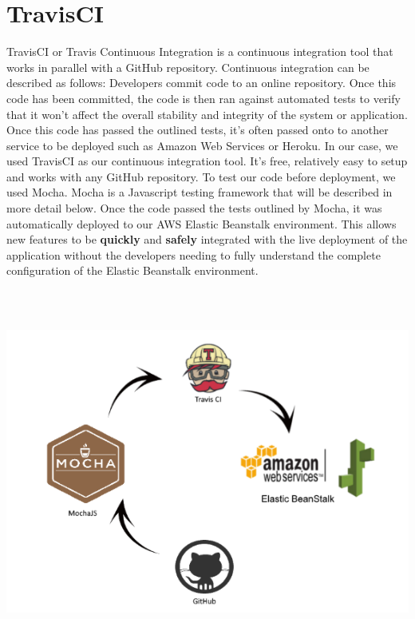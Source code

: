 \section{TravisCI}
TravisCI or Travis Continuous Integration is a continuous integration tool that works in parallel with a GitHub repository. Continuous integration can be described as follows: Developers commit code to an online repository. Once this code has been committed, the code is then ran against automated tests to verify that it won't affect the overall stability and integrity of the system or application. Once this
code has passed the outlined tests, it's often passed onto to another service to be deployed such as Amazon Web Services or Heroku. In our case, we used TravisCI as our continuous integration tool. It's free, relatively easy to setup and works with any GitHub repository. To test our code before deployment, we used Mocha. Mocha is a Javascript testing framework that will be described in more detail below. Once the code passed the tests outlined by Mocha, it was automatically deployed to our AWS Elastic Beanstalk environment. This allows new features to be \textbf{quickly} and \textbf{safely} integrated with the live deployment of the application without 
the developers needing to fully understand the complete configuration of the Elastic Beanstalk environment. 

\begin{center}    
	\includegraphics[width=14cm, height=12cm]{img/SDLC.png}
\end{center}


